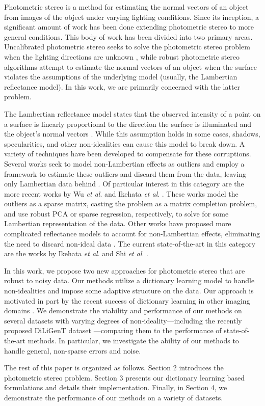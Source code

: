 
Photometric stereo \cite{woodham1980} is a method for estimating the normal vectors of an object from images of the object under varying lighting conditions. Since its inception, a significant amount of work has been done extending photometric stereo to more general conditions. This body of work has been divided into two primary areas. Uncalibrated photometric stereo seeks to solve the photometric stereo problem when the lighting directions are unknown \cite{hayakawa1994,belhumeur1999,yuille1999,georghiades2003}, while robust photometric stereo algorithms attempt to estimate the normal vectors of an object when the surface violates the assumptions of the underlying model (usually, the Lambertian reflectance model). In this work, we are primarily concerned with the latter problem.

The Lambertian reflectance model states that the observed intensity of a point on a surface is linearly proportional to the direction the surface is illuminated and the object's normal vectors \cite{woodham1980}. While this assumption holds in some cases, shadows, specularities, and other non-idealities can cause this model to break down. A variety of techniques have been developed to compensate for these corruptions. Several works seek to model non-Lambertian effects as outliers and employ a framework to estimate these outliers and discard them from the data, leaving only Lambertian data behind \cite{barsky2003,chandraker2007,verbiest2008,yu2010,wu2010}. Of particular interest in this category are the more recent works by Wu \textit{et al}. \cite{wu2011} and Ikehata \textit{et al}. \cite{ikehata2012}. These works model the outliers as a sparse matrix, casting the problem as a matrix completion problem, and use robust PCA or sparse regression, respectively, to solve for some Lambertian representation of the data. Other works have proposed more complicated reflectance models to account for non-Lambertian effects, eliminating the need to discard non-ideal data \cite{oren1995,hertzmann2005,alldrin2007_2,chung2008,alldrin2008,seitz2010,higo2010,shi2012,chandraker2013}.  The current state-of-the-art in this category are the works by Ikehata \textit{et al}. \cite{ikehata2014} and Shi \textit{et al}. \cite{shi2014}.


In this work, we propose two new approaches for photometric stereo that are robust to noisy data. Our methods utilize a dictionary learning model \cite{elad2006image,aharon2006rm} to handle non-idealities and impose some adaptive structure on the data. Our approach is motivated in part by the recent success of dictionary learning in other imaging domains \cite{ravishankar2011mr,ravishankar2016lassi}.
We demonstrate the viability and performance of our methods on several datasets with varying degrees of non-ideality---including the recently proposed DiLiGenT dataset \cite{shi2016}---comparing them to the performance of state-of-the-art methods. In particular, we investigate the ability of our methods to handle general, non-sparse errors and noise.

The rest of this paper is organized as follows. Section 2 introduces the photometric stereo problem. Section 3 presents our dictionary learning based formulations and details their implementation. Finally, in Section 4, we demonstrate the performance of our methods on a variety of datasets.

